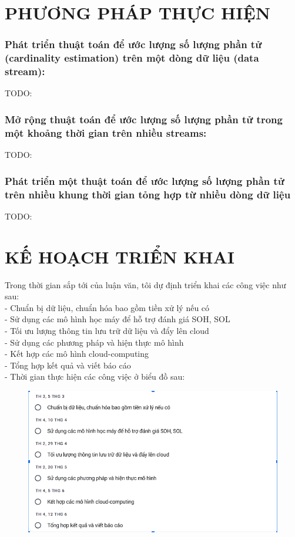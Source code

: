 \documentclass[a4paper,13pt]{article}
\theoremstyle{mytheor}
\begin{document}
\section{PHƯƠNG PHÁP THỰC HIỆN}
\subsubsection{Phát triển thuật toán để ước lượng số lượng phần tử (cardinality estimation) trên một dòng dữ liệu (data stream):}
TODO:
\subsubsection{Mở rộng thuật toán để ước lượng số lượng phần tử trong một khoảng thời gian trên nhiều streams:}
TODO:
\subsubsection{Phát triển một thuật toán để ước lượng số lượng phần tử trên nhiều khung thời gian tỏng hợp từ nhiều dòng dữ liệu}
TODO:

\section{KẾ HOẠCH TRIỂN KHAI}
Trong thời gian sắp tới của luận văn, tôi dự định triển khai các công việc như sau:\\
- Chuẩn bị dữ liệu, chuẩn hóa bao gồm tiền xử lý nếu có\\
- Sử dụng các mô hình học máy để hỗ trợ đánh giá SOH, SOL\\
- Tối ưu lượng thông tin lưu trữ dữ liệu và đẩy lên cloud \\
- Sử dụng các phương pháp và hiện thực mô hình \\
- Kết hợp các mô hình cloud-computing \\
- Tổng hợp kết quả và viết báo cáo\\
- Thời gian thực hiện các công việc ở biểu đồ sau:

\begin{figure}[h]
\begin{center}
\includegraphics[width=5in]{plan.png}
\end{center}
\end{figure} 
\end{document}
